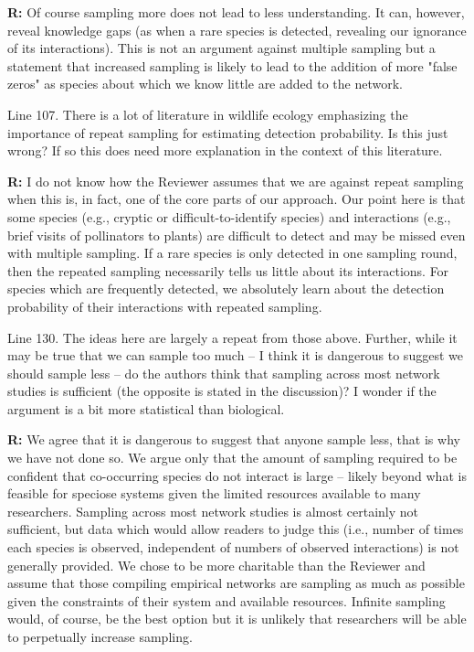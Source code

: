 \documentclass[12pt]{letter}
\newenvironment{refquote}{\bigskip \begin{it}}{\end{it}\smallskip}
\begin{document}
		\textbf{R:} Of course sampling more does not lead to less understanding. It can, however, reveal knowledge gaps (as when a rare species is detected, revealing our ignorance of its interactions). This is not an argument against multiple sampling but a statement that increased sampling is likely to lead to the addition of more "false zeros" as species about which we know little are added to the network.

		\begin{refquote}
		Line 107.  There is a lot of literature in wildlife ecology emphasizing the importance of repeat sampling for estimating detection probability.  Is this just wrong?  If so this does need more explanation in the context of this literature.
		\end{refquote}

		\textbf{R:} I do not know how the Reviewer assumes that we are against repeat sampling when this is, in fact, one of the core parts of our approach. Our point here is that some species (e.g., cryptic or difficult-to-identify species) and interactions (e.g., brief visits of pollinators to plants) are difficult to detect and may be missed even with multiple sampling. If a rare species is only detected in one sampling round, then the repeated sampling necessarily tells us little about its interactions. For species which are frequently detected, we absolutely learn about the detection probability of their interactions with repeated sampling.

		\begin{refquote}
		Line 130.  The ideas here are largely a repeat from those above.  Further, while it may be true that we can sample too much – I think it is dangerous to suggest we should sample less – do the authors think that sampling across most network studies is sufficient (the opposite is stated in the discussion)?  I wonder if the argument is a bit more statistical than biological.
		\end{refquote}

		\textbf{R:} We agree that it is dangerous to suggest that anyone sample less, that is why we have not done so. We argue only that the amount of sampling required to be confident that co-occurring species do not interact is large -- likely beyond what is feasible for speciose systems given the limited resources available to many researchers. Sampling across most network studies is almost certainly not sufficient, but data which would allow readers to judge this (i.e., number of times each species is observed, independent of numbers of observed interactions) is not generally provided. We chose to be more charitable than the Reviewer and assume that those compiling empirical networks are sampling as much as possible given the constraints of their system and available resources. Infinite sampling would, of course, be the best option but it is unlikely that researchers will be able to perpetually increase sampling.
\end{document}
